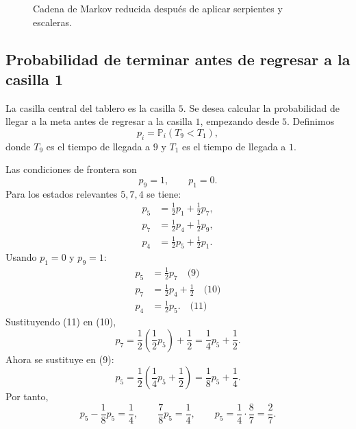 \documentclass[12pt,a4paper]{article}
\newcommand{\Prob}{\mathbb{P}}
\theoremstyle{definition}
\begin{document}
\begin{figure}[H]
\centering
{}
\caption{Cadena de Markov reducida después de aplicar serpientes y escaleras.}
\end{figure}

\subsection{Probabilidad de terminar antes de regresar a la casilla 1}

La casilla central del tablero es la casilla \(5\). Se desea calcular la probabilidad de llegar a la meta antes de regresar a la casilla \(1\), empezando desde \(5\). Definimos
\[
    p_i=\Prob_i(T_9<T_1),
\]
donde \(T_9\) es el tiempo de llegada a \(9\) y \(T_1\) es el tiempo de llegada a \(1\).

Las condiciones de frontera son
\[
    p_9=1,
    \qquad
    p_1=0.
\]
Para los estados relevantes \(5,7,4\) se tiene:
\[
\begin{aligned}
    p_5&=\frac12p_1+\frac12p_7,\\
    p_7&=\frac12p_4+\frac12p_9,\\
    p_4&=\frac12p_5+\frac12p_1.
\end{aligned}
\]
Usando \(p_1=0\) y \(p_9=1\):
\[
\begin{aligned}
    p_5&=\frac12p_7\quad\text{(9)}\\
    p_7&=\frac12p_4+\frac12\quad\text{(10)}\\
    p_4&=\frac12p_5.\quad\text{(11)}
\end{aligned}
\]
Sustituyendo (11) en (10),
\[
    p_7=\frac12\left(\frac12p_5\right)+\frac12
    =\frac14p_5+\frac12.
\]
Ahora se sustituye en (9):
\[
    p_5=\frac12\left(\frac14p_5+\frac12\right)
    =\frac18p_5+\frac14.
\]
Por tanto,
\[
    p_5-\frac18p_5=\frac14,
    \qquad
    \frac78p_5=\frac14,\qquad
    p_5=\frac14\cdot\frac87=\frac27.
\]
\end{document}
